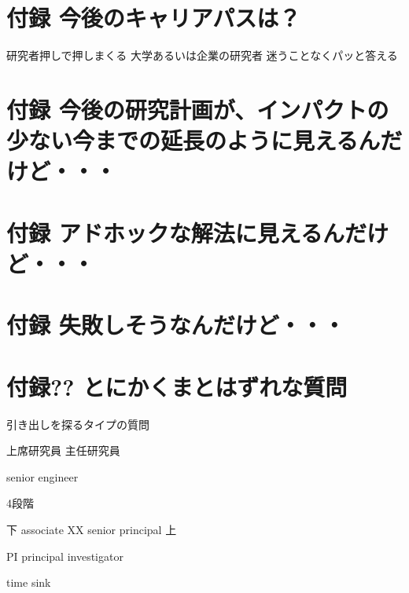 \section{付録 今後のキャリアパスは？}
\label{sec-21}

研究者押しで押しまくる
大学あるいは企業の研究者
迷うことなくパッと答える

\section{付録 今後の研究計画が、インパクトの少ない今までの延長のように見えるんだけど・・・}
\label{sec-22}


\section{付録 アドホックな解法に見えるんだけど・・・}
\label{sec-23}


\section{付録 失敗しそうなんだけど・・・}
\label{sec-24}


\section{付録?? とにかくまとはずれな質問}
\label{sec-25}

引き出しを探るタイプの質問



上席研究員
主任研究員

senior engineer

4段階

下
associate
XX
senior
principal
上

PI principal investigator

time sink
